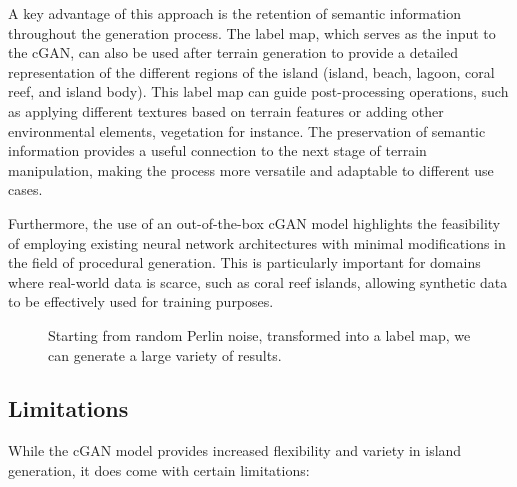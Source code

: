A key advantage of this approach is the retention of semantic information throughout the generation process. The label map, which serves as the input to the cGAN, can also be used after terrain generation to provide a detailed representation of the different regions of the island (island, beach, lagoon, coral reef, and island body). This label map can guide post-processing operations, such as applying different textures based on terrain features or adding other environmental elements, vegetation for instance. The preservation of semantic information provides a useful connection to the next stage of terrain manipulation, making the process more versatile and adaptable to different use cases.

Furthermore, the use of an out-of-the-box cGAN model highlights the feasibility of employing existing neural network architectures with minimal modifications in the field of procedural generation. This is particularly important for domains where real-world data is scarce, such as coral reef islands, allowing synthetic data to be effectively used for training purposes.

\begin{figure}
    \caption{Starting from random Perlin noise, transformed into a label map, we can generate a large variety of results.}
    \label{fig:coral-island-perlin-examples}
\end{figure}

\subsection{Limitations}
\label{sec:coral-island-limitations}

While the cGAN model provides increased flexibility and variety in island generation, it does come with certain limitations:

